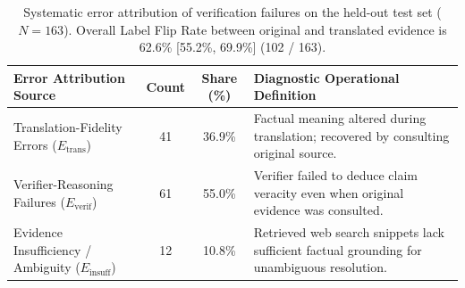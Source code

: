 \begin{table}[t]
\centering
\small
\caption{Systematic error attribution of verification failures on the held-out test set ($N=163$). Overall Label Flip Rate between original and translated evidence is 62.6\% [55.2\%, 69.9\%] (102 / 163).}
\label{tab:error-attribution}
\begin{tabularx}{\textwidth}{lccX}
\toprule
\textbf{Error Attribution Source} & \textbf{Count} & \textbf{Share (\%)} & \textbf{Diagnostic Operational Definition} \\
\midrule
Translation-Fidelity Errors ($E_{\text{trans}}$) & 41 & 36.9\% & Factual meaning altered during translation; recovered by consulting original source. \\
Verifier-Reasoning Failures ($E_{\text{verif}}$) & 61 & 55.0\% & Verifier failed to deduce claim veracity even when original evidence was consulted. \\
Evidence Insufficiency / Ambiguity ($E_{\text{insuff}}$) & 12 & 10.8\% & Retrieved web search snippets lack sufficient factual grounding for unambiguous resolution. \\
\bottomrule
\end{tabularx}
\end{table}